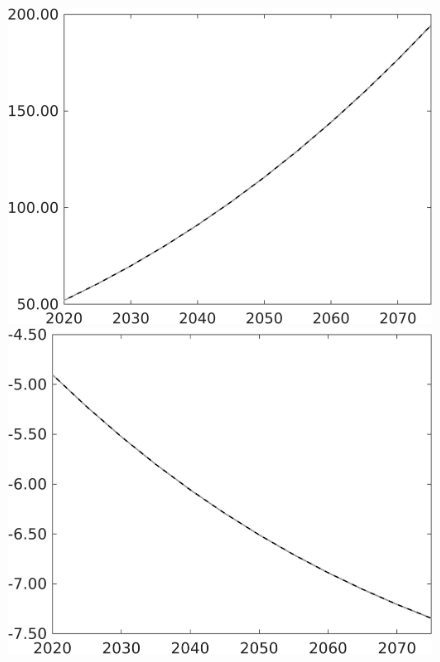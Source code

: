 \documentclass[12pt]{article}
\begin{document}
\begin{figure}[h!!]
\begin{minipage}[]{0.32\textwidth}
	\end{minipage}	
	\begin{minipage}[]{0.32\textwidth}
		\includegraphics[width=1\textwidth]{../../codding_model/own_basedOnFried/optimalPol_010922_revision/figures/all_13Sept22/PerdifNoTauf_regime0_CompTaul_sg_spillover0_nsk0_xgr0_knspil1_sep1_LFlimit0_emsbase0_countec0_GovRev0_etaa0.79_lgd0.png}
	\end{minipage}	
	\begin{minipage}[]{0.32\textwidth}
		\includegraphics[width=1\textwidth]{../../codding_model/own_basedOnFried/optimalPol_010922_revision/figures/all_13Sept22/PerdifNoTauf_regime0_CompTaul_wsn_spillover0_nsk0_xgr0_knspil1_sep1_LFlimit0_emsbase0_countec0_GovRev0_etaa0.79_lgd0.png}

\end{minipage}
\end{figure}
\end{document}
